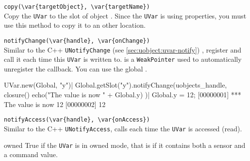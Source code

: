 \begin{urbiscriptapi}

\item \lstinline|copy(\var{targetObject}, \var{targetName})| \\
  Copy the \lstinline|UVar| to the slot  of object
  . Since the \lstinline|UVar| is using properties, you must
  use this method to copy it to an other location.

\item \lstinline|notifyChange(\var{handle}, \var{onChange})| \\
  Similar to the C++ \lstinline|UNotifyChange|
  (see \autoref{sec:uobject:uvar-notify}) , register  and
  call it each time this \lstinline|UVar| is written to.
   is a \lstinline|WeakPointer| used to automatically unregister
  the callback. You can use the global .
\begin{urbiscript}
UVar.new(Global, "y")|
Global.getSlot("y").notifyChange(uobjects_handle, closure() {
  echo("The value is now " + Global.y)
})|
Global.y = 12;
[00000001] *** The value is now 12
[00000002] 12
\end{urbiscript}

\item \lstinline|notifyAccess(\var{handle}, \var{onAccess})| \\
  Similar to the C++ \lstinline|UNotifyAccess|, calls  each time
  the \lstinline|UVar| is accessed (read).

\item[owned]
  True if the \lstinline|UVar| is in owned mode, that is if it contains both a
  sensor and a command value.

\end{urbiscriptapi}

